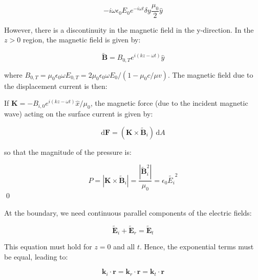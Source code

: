 \documentclass[12pt]{article}
\begin{document}
\begin{equation}
    -i\omega \epsilon_{0} E_{0} e^{-i\omega t} \delta y \frac{\mu_{0}}{2} \hat{y}
\end{equation}

\begin{correction}
    However, there is a discontinuity in the magnetic field in the y-direction. In the $z>0$ region, the magnetic field is given by:

    \begin{equation}
        \tilde{\mathbf{B}} = B_{0, T} e^{i(kz - \omega t)} \hat{y}
    \end{equation}

    where $B_{0, T} = \mu_{0} \epsilon_{0} \omega E_{0, T} = 2\mu_{0} \epsilon_{0} \omega E_{0} / (1 - \mu_{0}c/\mu v)$. The magnetic field due to the displacement current is then:
\end{correction}

If $\mathbf{K} = -B_{i, 0} e^{i(kz - \omega t)} \hat{x}/\mu_{0}$, the magnetic force (due to the incident magnetic wave) acting on the surface current is given by:

\begin{equation}
    \mathrm{d}\mathbf{F} = (\mathbf{K} \times \tilde{\mathbf{B}}_{i}) \, \mathrm{d}A
\end{equation}

so that the magnitude of the pressure is:

\begin{equation}
    P = \left\lvert \mathbf{K} \times \tilde{\mathbf{B}}_{i} \right\rvert = \frac{|\tilde{\mathbf{B}}_{i}^{2}|}{\mu_{0}} = \epsilon_{0} \tilde{E_{i}}^{2}
\end{equation}
\qed



At the boundary, we need continuous parallel components of the electric fields:

\begin{equation}
    \tilde{\mathbf{E}}_{i} + \tilde{\mathbf{E}}_{r} = \tilde{\mathbf{E}}_{t}
\end{equation}

This equation must hold for $z = 0$ and all $t$. Hence, the exponential terms must be equal, leading to:

\begin{equation}
    \mathbf{k}_{i} \cdot \mathbf{r} = \mathbf{k}_{r} \cdot \mathbf{r} = \mathbf{k}_{t} \cdot \mathbf{r}
\end{equation}
\end{document}
